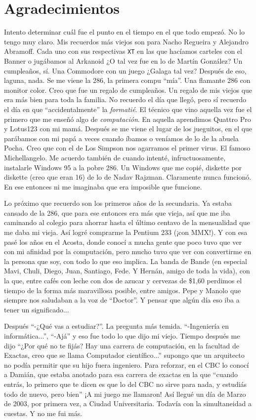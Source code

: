 
\chapter*{Agradecimientos}

Intento determinar cuál fue el punto en el tiempo en el que todo empezó. No lo tengo muy claro. Mis recuerdos más viejos son para Nacho Regueira y Alejandro Abramoff. Cada uno con sus respectivas \texttt{XT} en las que hacíamos carteles con el Banner o jugábamos al Arkanoid ¿O tal vez fue en lo de Martín González? Un cumpleaños, sí. Una Commodore con un juego ¿Galaga tal vez? Después de eso, laguna, nada. Se me viene la 286, la primera compu ``mía''. Una flamante 286 con monitor color. Creo que fue un regalo de cumpleaños. Un regalo de mis viejos que era más bien para toda la familia. No recuerdo el día que llegó, pero sí recuerdo el día en que ``accidentalmente'' la \emph{formatié}. El técnico que vino aquella vez fue el primero que me enseñó algo de \emph{computación}. En aquella aprendimos Quattro Pro y Lotus123 con mi mamá. Después se me viene el lugar de los jueguitos, en el que parábamos con mi papá a veces cuando íbamos o veníamos de lo de la abuela Pocha. Creo que con el de Los Simpson nos agarramos el primer virus. El famoso Michellangelo. Me acuerdo también de cuando intenté, infructuosamente, instalarle Windows 95 a la pobre 286. Un Windows que me copié, diskette por diskette (creo que eran 16) de lo de Nadav Rajzman. Claramente nunca funcionó. En ese entonces ni me imaginaba que era imposible que funcione.

Lo próximo que recuerdo son los primeros años de la secundaria. Ya estaba cansado de la 286, que para ese entonces era más que vieja, así que me iba caminando al colegio para ahorrar hasta el último centavo de la mensualidad que me daba mi vieja. Así logré comprarme la Pentium 233 (¡con MMX!). Y con esa pasé los años en el Acosta, donde conocí a mucha gente que poco tuvo que ver con mi afinidad por la computación, pero mucho tuvo que ver con convertirme en la persona que soy, con todo lo que eso implica. La banda de Bande (en especial Mavi, Chuli, Diego, Juan, Santiago, Fede. Y Hernán, amigo de toda la vida), con la que, entre cafés con leche con dos de azucar y cervezas de \$1,60 perdimos el tiempo de la forma más maravillosa posible, entre amigos. Pepe y Manolo que siempre nos saludaban a la voz de ``Doctor''. Y pensar que algún día eso iba a tener un significado...

Después ``-¿Qué vas a estudiar?''. La pregunta más temida. ``-Ingeniería en informática...'', ``-Ajá'' y eso fue todo lo que dijo mi viejo. Tiempo después me dijo ``¿Por qué no te fijás? Hay una carrera de computación, en la facultad de Exactas, creo que se llama Computador científico...'' supongo que un arquitecto no podía permitir que su hijo fuera ingeniero. Para reforzar, en el CBC lo conocí a Damián, que estaba anotado para esa carrera de exactas en la que ``cuando entrás, lo primero que te dicen es que lo del CBC no sirve para nada, y estudiás todo de nuevo, pero bien'' ¡A mi juego me llamaron! Así llegué un día de Marzo de 2003, por primera vez, a Ciudad Universitaria. Todavía con la simultaneidad a cuestas. Y no me fui más.

